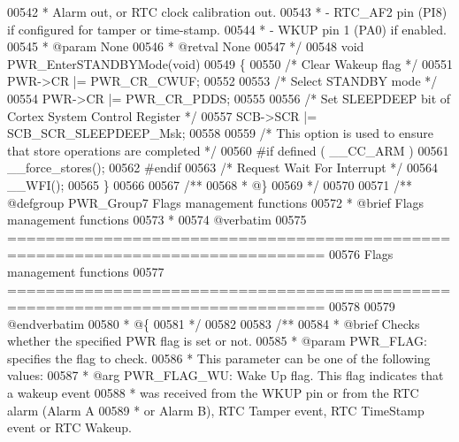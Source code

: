 \begin{DoxyCode}
00542 \textcolor{comment}{  *            Alarm out, or RTC clock calibration out.}
00543 \textcolor{comment}{  *          - RTC\_AF2 pin (PI8) if configured for tamper or time-stamp.  }
00544 \textcolor{comment}{  *          - WKUP pin 1 (PA0) if enabled.       }
00545 \textcolor{comment}{  * @param  None}
00546 \textcolor{comment}{  * @retval None}
00547 \textcolor{comment}{  */}
00548 \textcolor{keywordtype}{void} PWR_EnterSTANDBYMode(\textcolor{keywordtype}{void})
00549 \{
00550   \textcolor{comment}{/* Clear Wakeup flag */}
00551   PWR->CR |= PWR_CR_CWUF;
00552 
00553   \textcolor{comment}{/* Select STANDBY mode */}
00554   PWR->CR |= PWR_CR_PDDS;
00555 
00556   \textcolor{comment}{/* Set SLEEPDEEP bit of Cortex System Control Register */}
00557   SCB->SCR |= SCB\_SCR\_SLEEPDEEP\_Msk;
00558 
00559 \textcolor{comment}{/* This option is used to ensure that store operations are completed */}
00560 \textcolor{preprocessor}{#}\textcolor{preprocessor}{if} \textcolor{preprocessor}{defined} \textcolor{preprocessor}{(} \textcolor{preprocessor}{\_\_CC\_ARM}   \textcolor{preprocessor}{)}
00561   \_\_force\_stores();
00562 \textcolor{preprocessor}{#}\textcolor{preprocessor}{endif}
00563   \textcolor{comment}{/* Request Wait For Interrupt */}
00564   \_\_WFI();
00565 \}
00566 
00567 \textcolor{comment}{/**}
00568 \textcolor{comment}{  * @\}}
00569 \textcolor{comment}{  */}
00570 
00571 \textcolor{comment}{/** @defgroup PWR\_Group7 Flags management functions}
00572 \textcolor{comment}{ *  @brief   Flags management functions }
00573 \textcolor{comment}{ *}
00574 \textcolor{comment}{@verbatim   }
00575 \textcolor{comment}{ ===============================================================================}
00576 \textcolor{comment}{                           Flags management functions}
00577 \textcolor{comment}{ ===============================================================================  }
00578 \textcolor{comment}{}
00579 \textcolor{comment}{@endverbatim}
00580 \textcolor{comment}{  * @\{}
00581 \textcolor{comment}{  */}
00582 
00583 \textcolor{comment}{/**}
00584 \textcolor{comment}{  * @brief  Checks whether the specified PWR flag is set or not.}
00585 \textcolor{comment}{  * @param  PWR\_FLAG: specifies the flag to check.}
00586 \textcolor{comment}{  *          This parameter can be one of the following values:}
00587 \textcolor{comment}{  *            @arg PWR\_FLAG\_WU: Wake Up flag. This flag indicates that a wakeup event }
00588 \textcolor{comment}{  *                  was received from the WKUP pin or from the RTC alarm (Alarm A }
00589 \textcolor{comment}{  *                  or Alarm B), RTC Tamper event, RTC TimeStamp event or RTC Wakeup.}

\end{DoxyCode}
